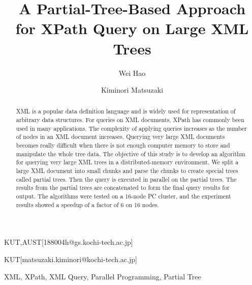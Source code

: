\documentclass[PRO,english]{ipsj}
\begin{document}
\title{A Partial-Tree-Based Approach\\ for XPath Query on Large XML Trees}


\author{Wei Hao}{KUT,AUST}[188004h@gs.kochi-tech.ac.jp]
\author{Kiminori Matsuzaki}{KUT}[matsuzaki.kiminori@kochi-tech.ac.jp]

\begin{abstract}
XML is a popular data definition language and 
is widely used for representation of arbitrary data structures. 
For queries on XML documents, XPath has commonly been 
 used in many applications. The complexity of 
applying queries increases as the number of nodes in an 
XML document increases. Querying very large XML 
documents becomes really difficult when there is not enough  
computer memory to store and manipulate 
the whole tree data. The objective of this study is to 
develop an algorithm for querying very large XML trees in a
distributed-memory environment. We split a large 
XML document into small chunks and parse the chunks to 
create special trees called partial trees. Then the query is 
executed in parallel on the partial trees. The results from 
the partial trees are concatenated to form the final query 
results for output. The algorithms were tested on a 16-node 
PC cluster, and the experiment results showed a speedup 
of a factor of 6 on 16 nodes. 
\end{abstract}

\begin{keyword}
XML, XPath, XML Query, Parallel Programming, Partial Tree
\end{keyword}

\maketitle
















\end{document}
